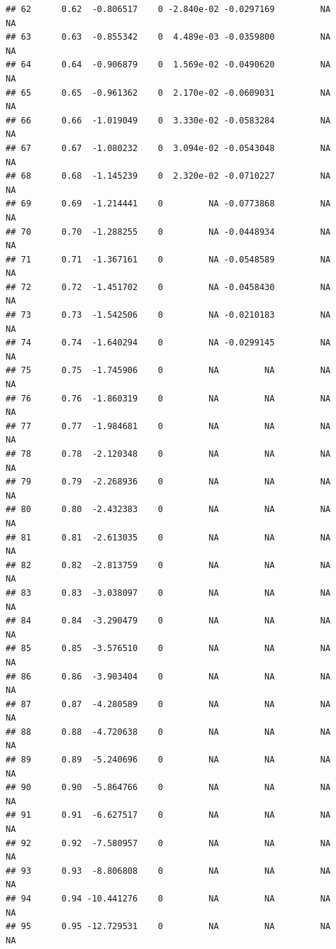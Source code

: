 \documentclass{article}\usepackage[]{graphicx}\usepackage[]{color}
\makeatletter
\newenvironment{kframe}{%
 \def\at@end@of@kframe{}%
 \ifinner\ifhmode%
  \def\at@end@of@kframe{\end{minipage}}%
  \begin{minipage}{\columnwidth}%
 \fi\fi%
 \def\FrameCommand##1{\hskip\@totalleftmargin \hskip-\fboxsep
 \colorbox{shadecolor}{##1}\hskip-\fboxsep
     \hskip-\linewidth \hskip-\@totalleftmargin \hskip\columnwidth}%
 \MakeFramed {\advance\hsize-\width
   \@totalleftmargin\z@ \linewidth\hsize
   \@setminipage}}%
 {\par\unskip\endMakeFramed%
 \at@end@of@kframe}
\newenvironment{knitrout}{}{} %
\makeatother
\begin{document}
\begin{knitrout}
\begin{kframe}
\begin{verbatim}
## 62      0.62  -0.806517    0 -2.840e-02 -0.0297169         NA          NA
## 63      0.63  -0.855342    0  4.489e-03 -0.0359800         NA          NA
## 64      0.64  -0.906879    0  1.569e-02 -0.0490620         NA          NA
## 65      0.65  -0.961362    0  2.170e-02 -0.0609031         NA          NA
## 66      0.66  -1.019049    0  3.330e-02 -0.0583284         NA          NA
## 67      0.67  -1.080232    0  3.094e-02 -0.0543048         NA          NA
## 68      0.68  -1.145239    0  2.320e-02 -0.0710227         NA          NA
## 69      0.69  -1.214441    0         NA -0.0773868         NA          NA
## 70      0.70  -1.288255    0         NA -0.0448934         NA          NA
## 71      0.71  -1.367161    0         NA -0.0548589         NA          NA
## 72      0.72  -1.451702    0         NA -0.0458430         NA          NA
## 73      0.73  -1.542506    0         NA -0.0210183         NA          NA
## 74      0.74  -1.640294    0         NA -0.0299145         NA          NA
## 75      0.75  -1.745906    0         NA         NA         NA          NA
## 76      0.76  -1.860319    0         NA         NA         NA          NA
## 77      0.77  -1.984681    0         NA         NA         NA          NA
## 78      0.78  -2.120348    0         NA         NA         NA          NA
## 79      0.79  -2.268936    0         NA         NA         NA          NA
## 80      0.80  -2.432383    0         NA         NA         NA          NA
## 81      0.81  -2.613035    0         NA         NA         NA          NA
## 82      0.82  -2.813759    0         NA         NA         NA          NA
## 83      0.83  -3.038097    0         NA         NA         NA          NA
## 84      0.84  -3.290479    0         NA         NA         NA          NA
## 85      0.85  -3.576510    0         NA         NA         NA          NA
## 86      0.86  -3.903404    0         NA         NA         NA          NA
## 87      0.87  -4.280589    0         NA         NA         NA          NA
## 88      0.88  -4.720638    0         NA         NA         NA          NA
## 89      0.89  -5.240696    0         NA         NA         NA          NA
## 90      0.90  -5.864766    0         NA         NA         NA          NA
## 91      0.91  -6.627517    0         NA         NA         NA          NA
## 92      0.92  -7.580957    0         NA         NA         NA          NA
## 93      0.93  -8.806808    0         NA         NA         NA          NA
## 94      0.94 -10.441276    0         NA         NA         NA          NA
## 95      0.95 -12.729531    0         NA         NA         NA          NA

\end{verbatim}
\end{kframe}
\end{knitrout}
\end{document}
